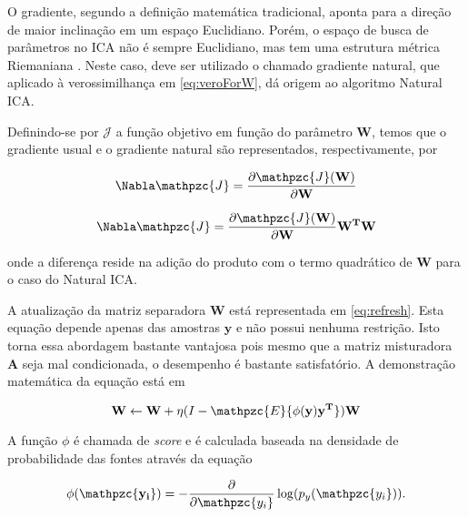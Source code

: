     O gradiente, segundo a definição matemática tradicional, aponta para a direção de maior inclinação em um espaço Euclidiano. Porém, o espaço de busca de parâmetros no ICA não é sempre Euclidiano, mas tem uma estrutura métrica Riemaniana \cite{Riemenn}. Neste caso, deve ser utilizado o chamado gradiente natural, que aplicado à verossimilhança em \ref{eq:veroForW}, dá origem ao algoritmo Natural ICA.
    
    Definindo-se por $\mathcal{J}$ a função objetivo em função do parâmetro $\mathbf{W}$, temos que o gradiente usual e o gradiente natural são representados, respectivamente, por
    
    \begin{equation}
        \label{eq:gradiente}
        \Nabla\mathpzc{J} = \frac{\partial \mathpzc{J}(\mathbf{W})}{\partial \mathbf{W}}
    \end{equation}
    
        \begin{equation}
        \label{eq:naturalgradiente}
        \Nabla\mathpzc{J} = \frac{\partial \mathpzc{J}(\mathbf{W})}{\partial \mathbf{W}}\mathbf{W^T}\mathbf{W}
    \end{equation}
    
    onde a diferença reside na adição do produto com o termo quadrático de $\mathbf{W}$ para o caso do Natural ICA.
    
    A atualização da matriz separadora $\mathbf{W}$ está representada em \ref{eq:refresh}. Esta equação depende apenas das amostras $\mathbf{y}$ e não possui nenhuma restrição. Isto torna essa abordagem bastante vantajosa pois mesmo que a matriz misturadora $\mathbf{A}$ seja mal condicionada, o desempenho é bastante satisfatório. A demonstração matemática da equação está em \cite{ICA3}
    
    \begin{equation}
    \label{eq:refresh}
    \mathbf{W} \leftarrow \mathbf{W} + \eta(I - \mathpzc{E}\{\phi({\mathbf{y})\mathbf{y^T}}\})\mathbf{W}
    \end{equation}
    
    A função $\phi$ é chamada de \textit{score} e é calculada baseada na densidade de probabilidade das fontes através da equação
    
        \begin{equation}
    \label{eq:score}
    \mathbf{\phi({\mathpzc{y_i}})} = - \frac{\partial}{\partial \mathpzc{y_i}} \log(p_y(\mathpzc{y_i})).
    \end{equation}
    
